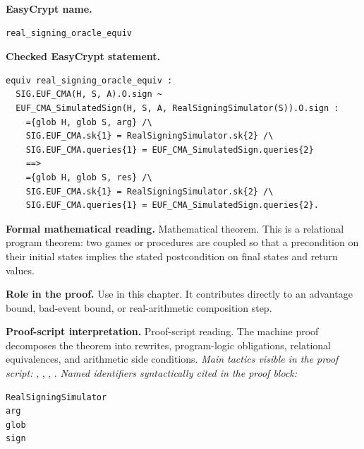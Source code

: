 \begin{formaltheorem}
\noindent\textbf{EasyCrypt name.}
\begin{lstlisting}[language=EasyCrypt,basicstyle=\ttfamily\scriptsize]
real_signing_oracle_equiv
\end{lstlisting}
\noindent\textbf{Checked EasyCrypt statement.}
\begin{lstlisting}[language=EasyCrypt,basicstyle=\ttfamily\scriptsize]
equiv real_signing_oracle_equiv :
  SIG.EUF_CMA(H, S, A).O.sign ~
  EUF_CMA_SimulatedSign(H, S, A, RealSigningSimulator(S)).O.sign :
    ={glob H, glob S, arg} /\
    SIG.EUF_CMA.sk{1} = RealSigningSimulator.sk{2} /\
    SIG.EUF_CMA.queries{1} = EUF_CMA_SimulatedSign.queries{2}
    ==>
    ={glob H, glob S, res} /\
    SIG.EUF_CMA.sk{1} = RealSigningSimulator.sk{2} /\
    SIG.EUF_CMA.queries{1} = EUF_CMA_SimulatedSign.queries{2}.
\end{lstlisting}
\noindent\textbf{Formal mathematical reading.}
Mathematical theorem. This is a relational program theorem: two games or procedures are coupled so that a precondition on their initial states implies the stated postcondition on final states and return values.

\noindent\textbf{Role in the proof.}
Use in this chapter. It contributes directly to an advantage bound, bad-event bound, or real-arithmetic composition step.

\noindent\textbf{Proof-script interpretation.}
Proof-script reading. The machine proof decomposes the theorem into rewrites, program-logic obligations, relational equivalences, and arithmetic side conditions.
\emph{Main tactics visible in the proof script:} \ec{proc}, \ec{inline}, \ec{wp}, \ec{call}.
\emph{Named identifiers syntactically cited in the proof block:}
\begin{lstlisting}[language=EasyCrypt,basicstyle=\ttfamily\scriptsize]
RealSigningSimulator
arg
glob
sign
\end{lstlisting}

\end{formaltheorem}

